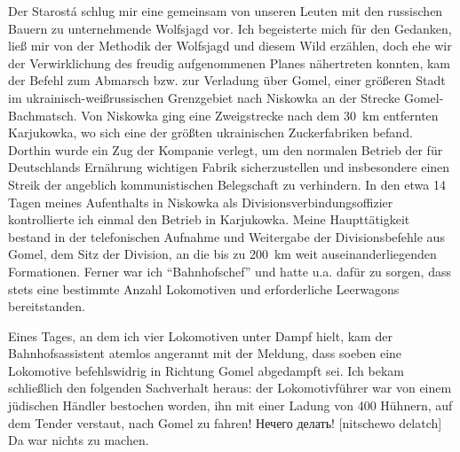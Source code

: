 Der Starostá schlug mir eine gemeinsam von unseren Leuten mit den russischen Bauern zu unternehmende Wolfsjagd vor. Ich begeisterte mich für den Gedanken, ließ mir von der Methodik der Wolfsjagd und diesem Wild erzählen, doch ehe wir der Verwirklichung des freudig aufgenommenen Planes nähertreten konnten, kam der Befehl zum Abmarsch bzw. zur Verladung über Gomel, einer größeren Stadt im ukrainisch-weißrussischen Grenzgebiet nach Niskowka an der Strecke Gomel-Bachmatsch.  Von Niskowka ging eine Zweigstrecke nach dem 30~km entfernten Karjukowka, wo sich eine der größten ukrainischen Zuckerfabriken befand. Dorthin wurde ein Zug der Kompanie verlegt, um den normalen Betrieb der für Deutschlands Ernährung wichtigen Fabrik sicherzustellen und insbesondere einen Streik der angeblich kommunistischen Belegschaft zu verhindern. In den etwa 14 Tagen meines Aufenthalts in Niskowka als Divisionsverbindungsoffizier kontrollierte ich einmal den Betrieb in Karjukowka. Meine Haupttätigkeit bestand in der telefonischen Aufnahme und Weitergabe der Divisionsbefehle aus Gomel, dem Sitz der Division, an die bis zu 200~km weit auseinanderliegenden Formationen. Ferner war ich \enquote{Bahnhofschef} und hatte u.a. dafür zu sorgen, dass stets eine bestimmte Anzahl Lokomotiven und erforderliche Leerwagons bereitstanden.

Eines Tages, an dem ich vier Lokomotiven unter Dampf hielt, kam der Bahnhofsassistent atemlos angerannt mit der Meldung, dass soeben eine Lokomotive befehlswidrig in Richtung Gomel abgedampft sei. Ich bekam schließlich den folgenden Sachverhalt heraus: der Lokomotivführer war von einem jüdischen Händler bestochen worden, ihn mit einer Ladung von 400 Hühnern, auf dem Tender verstaut, nach Gomel zu fahren! Нечего делать! [nitschewo delatch] Da war nichts zu machen.

